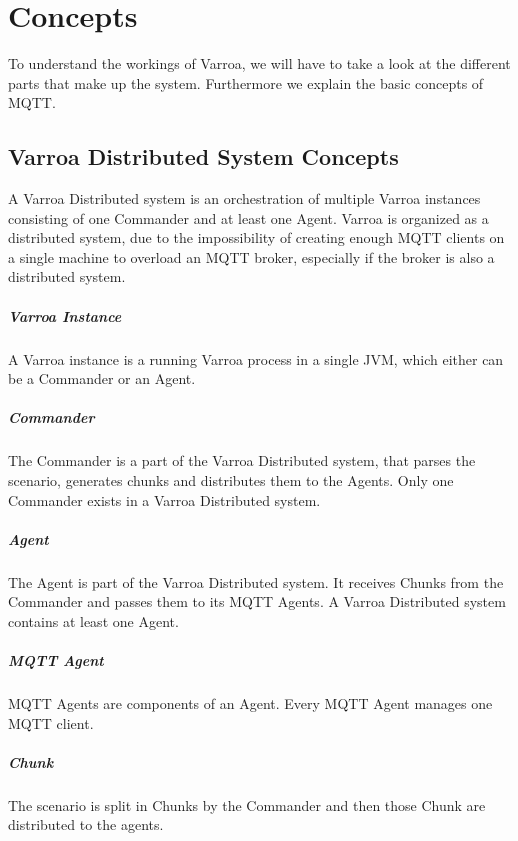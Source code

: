 \chapter{Concepts}
To understand the workings of Varroa, we will have to take a look at the different parts that make up the system.
Furthermore we explain the basic concepts of MQTT.

\section{Varroa Distributed System Concepts}
A Varroa Distributed system is an orchestration of multiple Varroa instances consisting of one Commander and at least one Agent.
Varroa is organized as a distributed system, due to the impossibility of creating enough MQTT clients on a single machine to overload an MQTT broker, especially if the broker is also a distributed system.

\paragraph{Varroa Instance}
A Varroa instance is a running Varroa process in a single JVM, which either can be a Commander or an Agent.

\paragraph{Commander}
The Commander is a part of the Varroa Distributed system, that parses the scenario, generates chunks and distributes them to the Agents.
Only one Commander exists in a Varroa Distributed system.

\paragraph{Agent}
The Agent is part of the Varroa Distributed system.
It receives Chunks from the Commander and passes them to its MQTT Agents.
A Varroa Distributed system contains at least one Agent.

\paragraph{MQTT Agent}
MQTT Agents are components of an Agent.
Every MQTT Agent manages one MQTT client.

\paragraph{Chunk}
The scenario is split in Chunks by the Commander and then those Chunk are distributed to the agents.

